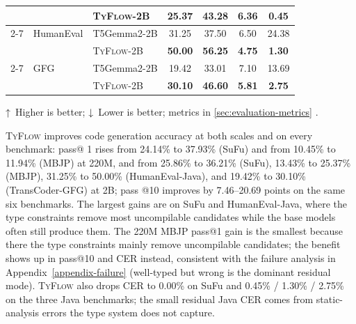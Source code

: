 \documentclass[manuscript,screen]{acmart}
\newcommand{\updir}{\textcolor{black}{↑}}  %
\newcommand{\downdir}{\textcolor{black}{↓}}
\newcommand{\toolname}[1]{\textsc{#1}}
\newcommand{\mainname}{\toolname{TyFlow}\xspace}
\begin{document}
\begin{table}[ht]
\begin{threeparttable}
\begin{tabular}{
    l 
    l
    l
    c 
    c 
    c 
    c
}
        &       & \mainname{\color{revblue}-2B        }& \textbf{\color{revblue}25.37} & \textbf{\color{revblue}43.28} & \textbf{\color{revblue}6.36} & \textbf{\color{revblue}0.45} \\
        \cmidrule(lr){2-7}
        & {\color{revblue}HumanEval }&  T5Gemma2-2B &    {\color{revblue}31.25 } &    {\color{revblue}37.50 } &    {\color{revblue}6.50 } &    {\color{revblue}24.38 } \\
 &       &  \mainname   {\color{revblue}-2B        } &    \textbf{\color{revblue}50.00}  &    \textbf{\color{revblue}56.25}  &    \textbf{\color{revblue}4.75}  &    \textbf{\color{revblue}1.30}  \\
         \cmidrule(lr){2-7}
         &  {\color{revblue}GFG }& {\color{revblue}T5Gemma2-2B }& {\color{revblue}19.42 }& {\color{revblue}33.01 }& {\color{revblue}7.10 }& {\color{revblue}13.69 }\\
        &      &  \mainname-2B        & \textbf{\color{revblue}30.10} & \textbf{\color{revblue}46.60} & \textbf{\color{revblue}5.81} & \textbf{\color{revblue}2.75} \\
\bottomrule
\end{tabular}
\begin{tablenotes}
\footnotesize
\item \updir\, Higher is better; \downdir\, Lower is better;  \textbf{} %
  {\color{revblue}metrics in } \autoref{sec:evaluation-metrics}  .
\end{tablenotes}
\end{threeparttable}
\end{table}

\mainname   improves code generation accuracy  %
  {\color{revblue}at both scales and on every benchmark: } pass@   {\color{revblue}1 rises from 24.14\% } to  %
  {\color{revblue}37.93\% (SuFu) and from 10.45\% to 11.94\% (MBJP) at 220M, and from 25.86\% } to  {\color{revblue}36.21\% (SuFu), 13.43\% to 25.37\% (MBJP), 31.25\% to } 50.00\%  %
  {\color{revblue}(HumanEval-Java), and 19.42\% to 30.10\% (TransCoder-GFG) at 2B; pass} @10    {\color{revblue}improves by 7.46--20.69 points on the same six benchmarks.
The largest gains are on SuFu } and  %
  {\color{revblue}HumanEval-Java, where the type constraints remove most uncompilable candidates while the base models often still produce them.
The 220M MBJP pass@1 gain is the smallest because there the type constraints mainly remove uncompilable candidates; the benefit shows up in pass@10 and CER instead, consistent with the failure analysis in Appendix~\ref{appendix-failure} (well-typed but wrong is the dominant residual mode).
}\mainname{} {\color{revblue}also drops CER to 0.00\% on SuFu and 0.45\% / 1.30\% / 2.75\% on the three Java benchmarks; the small residual Java CER comes from static-analysis errors the type system does not capture.
} 
\end{document}
